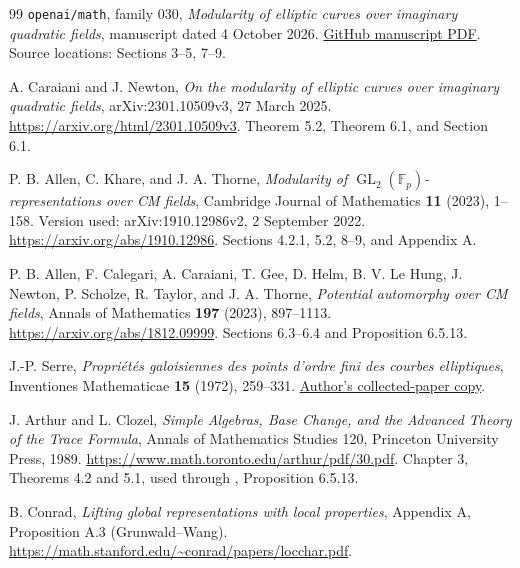 \documentclass[11pt,a4paper]{article}
\theoremstyle{definition}\newtheorem{definition}[theorem]{Definition}
\theoremstyle{remark}\newtheorem*{remark}{Remark}
\newcommand{\F}{\mathbb F}\newcommand{\OO}{\mathcal O}
\newcommand{\GL}{\operatorname{GL}}\newcommand{\SL}{\operatorname{SL}}
\begin{document}
\begin{thebibliography}{99}
\texttt{openai/math}, family 030,
\emph{Modularity of elliptic curves over imaginary quadratic fields},
manuscript dated 4 October 2026.
\href{https://github.com/openai/math/blob/main/preprints/Modularity-of-elliptic-curves-over-imaginary-quadratic-fields-October-4-2026/paper.pdf}{GitHub manuscript PDF}.
Source locations: Sections 3--5, 7--9.

A. Caraiani and J. Newton,
\emph{On the modularity of elliptic curves over imaginary quadratic fields},
arXiv:2301.10509v3, 27 March 2025.
\url{https://arxiv.org/html/2301.10509v3}.
Theorem 5.2, Theorem 6.1, and Section 6.1.

P. B. Allen, C. Khare, and J. A. Thorne,
\emph{Modularity of $\GL_2(\F_p)$-representations over CM fields},
Cambridge Journal of Mathematics \textbf{11} (2023), 1--158.
Version used: arXiv:1910.12986v2, 2 September 2022.
\url{https://arxiv.org/abs/1910.12986}.
Sections 4.2.1, 5.2, 8--9, and Appendix A.

P. B. Allen, F. Calegari, A. Caraiani, T. Gee, D. Helm,
B. V. Le Hung, J. Newton, P. Scholze, R. Taylor, and J. A. Thorne,
\emph{Potential automorphy over CM fields},
Annals of Mathematics \textbf{197} (2023), 897--1113.
\url{https://arxiv.org/abs/1812.09999}.
Sections 6.3--6.4 and Proposition 6.5.13.

J.-P. Serre, \emph{Propri\'et\'es galoisiennes des points d'ordre fini des
courbes elliptiques}, Inventiones Mathematicae \textbf{15} (1972), 259--331.
\href{https://www.college-de-france.fr/media/jean-pierre-serre/UPL5874918517843398173_Serre_proprie_te_s_galoisiennes_des_courbes_elliptiques.pdf}{Author's collected-paper copy}.

J. Arthur and L. Clozel, \emph{Simple Algebras, Base Change, and the Advanced
Theory of the Trace Formula}, Annals of Mathematics Studies 120,
Princeton University Press, 1989.
\url{https://www.math.toronto.edu/arthur/pdf/30.pdf}.
Chapter 3, Theorems 4.2 and 5.1, used through \cite{ACC}, Proposition 6.5.13.

B. Conrad, \emph{Lifting global representations with local properties},
Appendix A, Proposition A.3 (Grunwald--Wang).
\url{https://math.stanford.edu/~conrad/papers/locchar.pdf}.
\end{thebibliography}
\end{document}
